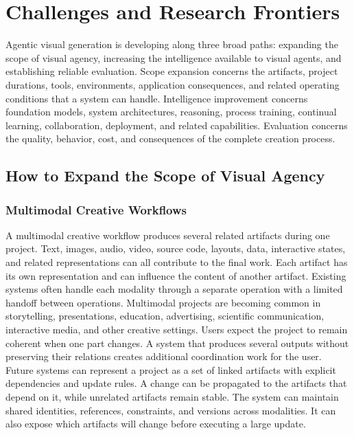 \section{Challenges and Research Frontiers}
\label{sec:frontiers}

Agentic visual generation is developing along three broad paths: expanding the scope of visual agency, increasing the intelligence available to visual agents, and establishing reliable evaluation. Scope expansion concerns the artifacts, project durations, tools, environments, application consequences, and related operating conditions that a system can handle. Intelligence improvement concerns foundation models, system architectures, reasoning, process training, continual learning, collaboration, deployment, and related capabilities. Evaluation concerns the quality, behavior, cost, and consequences of the complete creation process.

\subsection{How to Expand the Scope of Visual Agency}

\subsubsection{Multimodal Creative Workflows}

A multimodal creative workflow produces several related artifacts during one project. Text, images, audio, video, source code, layouts, data, interactive states, and related representations can all contribute to the final work. Each artifact has its own representation and can influence the content of another artifact. Existing systems often handle each modality through a separate operation with a limited handoff between operations. Multimodal projects are becoming common in storytelling, presentations, education, advertising, scientific communication, interactive media, and other creative settings. Users expect the project to remain coherent when one part changes. A system that produces several outputs without preserving their relations creates additional coordination work for the user. Future systems can represent a project as a set of linked artifacts with explicit dependencies and update rules. A change can be propagated to the artifacts that depend on it, while unrelated artifacts remain stable. The system can maintain shared identities, references, constraints, and versions across modalities. It can also expose which artifacts will change before executing a large update.


